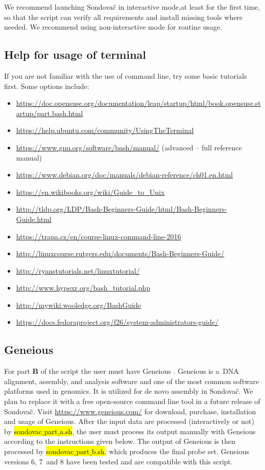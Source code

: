 \documentclass[a4paper, 11pt, twoside]{article}
\renewcommand{\texttt}[1]{\hl{\ttfamily #1}}
\begin{document}
We recommend launching Sondovač in interactive mode,at least for the first time, so that the script can verify all requirements and install missing tools where needed. We recommend using non-interactive mode for routine usage.

\subsection{Help for usage of terminal}

If you are not familiar with the use of command line, try some basic tutorials first. Some options include:

\begin{itemize}
  \item \url{https://doc.opensuse.org/documentation/leap/startup/html/book.opensuse.startup/part.bash.html}
  \item \url{https://help.ubuntu.com/community/UsingTheTerminal}
  \item \url{https://www.gnu.org/software/bash/manual/} (advanced -- full reference manual)
  \item \url{https://www.debian.org/doc/manuals/debian-reference/ch01.en.html}
  \item \url{https://en.wikibooks.org/wiki/Guide_to_Unix}
  \item \url{http://tldp.org/LDP/Bash-Beginners-Guide/html/Bash-Beginners-Guide.html}
  \item \url{https://trapa.cz/en/course-linux-command-line-2016}
  \item \url{http://linuxcourse.rutgers.edu/documents/Bash-Beginners-Guide/}
  \item \url{http://ryanstutorials.net/linuxtutorial/}
  \item \url{http://www.hypexr.org/bash_tutorial.php}
  \item \url{http://mywiki.wooledge.org/BashGuide}
  \item \url{https://docs.fedoraproject.org/f26/system-administrators-guide/}
\end{itemize}

\subsection{Geneious}
\label{geneious}

For part \textbf{B} of the script the user must have Geneious \citep{Kearse2012}. Geneious is a~DNA alignment, assembly, and analysis software and one of the most common software platforms used in genomics. It is utilized for de novo assembly in Sondovač. We plan to replace it with a free open-source command line tool in a future release of Sondovač. Visit \url{https://www.geneious.com/} for download, purchase, installation and usage of Geneious. After the input data are processed (interactively or not) by \texttt{sondovac$\_$part$\_$a.sh}, the user must process its output manually with Geneious according to the instructions given below. The output of Geneious is then processed by \texttt{sondovac$\_$part$\_$b.sh}, which produces the final probe set. Geneious versions 6, 7~and 8 have been tested and are compatible with this script.
\end{document}
